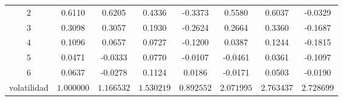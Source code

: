 \documentclass[10pt]{article} %
\begin{document}
\begin{table}[!htbp]
\begin{tabular}{lrrrrrrr}
\multicolumn{1}{|c|}{$2$}&\multicolumn{1}{|c|}{0.6110}&\multicolumn{1}{|c|}{0.6205}&\multicolumn{1}{|c|}{0.4336}&\multicolumn{1}{|c|}{-0.3373}&\multicolumn{1}{|c|}{0.5580}&\multicolumn{1}{|c|}{0.6037}&\multicolumn{1}{|c|}{-0.0329}\\
\multicolumn{1}{|c|}{$3$}&\multicolumn{1}{|c|}{0.3098}&\multicolumn{1}{|c|}{0.3057}&\multicolumn{1}{|c|}{0.1930}&\multicolumn{1}{|c|}{-0.2624}&\multicolumn{1}{|c|}{0.2664}&\multicolumn{1}{|c|}{0.3360}&\multicolumn{1}{|c|}{-0.1687}\\
\multicolumn{1}{|c|}{$4$}&\multicolumn{1}{|c|}{0.1096}&\multicolumn{1}{|c|}{0.0657}&\multicolumn{1}{|c|}{0.0727}&\multicolumn{1}{|c|}{-0.1200}&\multicolumn{1}{|c|}{0.0387}&\multicolumn{1}{|c|}{0.1244}&\multicolumn{1}{|c|}{-0.1815}\\
\multicolumn{1}{|c|}{$5$}&\multicolumn{1}{|c|}{0.0471}&\multicolumn{1}{|c|}{-0.0333}&\multicolumn{1}{|c|}{0.0770}&\multicolumn{1}{|c|}{-0.0107}&\multicolumn{1}{|c|}{-0.0461}&\multicolumn{1}{|c|}{0.0361}&\multicolumn{1}{|c|}{-0.1097}\\
\multicolumn{1}{|c}{$6$}&\multicolumn{1}{c}{0.0637}&\multicolumn{1}{c}{-0.0278}&\multicolumn{1}{c}{0.1124}&\multicolumn{1}{c}{0.0186}&\multicolumn{1}{c}{-0.0171}&\multicolumn{1}{c}{0.0503}&\multicolumn{1}{c|}{-0.0190}\\
\multicolumn{1}{c}{volatilidad}&\multicolumn{1}{c}{$1.000000$}&\multicolumn{1}{c}{$1.166532$}&\multicolumn{1}{c}{$1.530219$}&\multicolumn{1}{c}{$0.892552$}&\multicolumn{1}{c}{$2.071995$}&\multicolumn{1}{c}{$2.763437$}&\multicolumn{1}{c}{$2.728699$}\\
\end{tabular}
\end{table}
\end{document}
